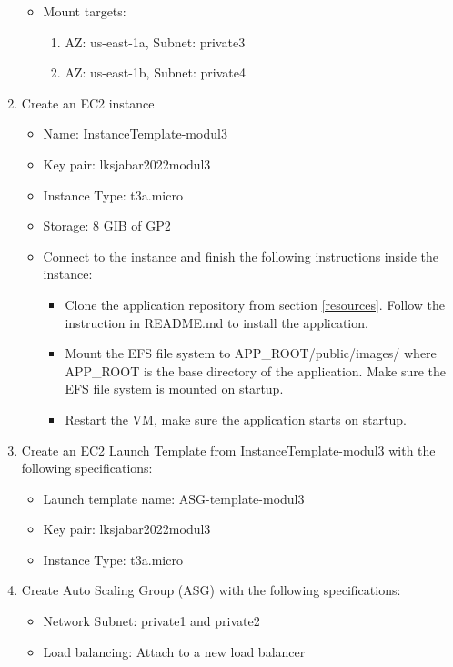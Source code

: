 \documentclass{article}
\begin{document}
\begin{enumerate}
\begin{itemize}
        \item Mount targets:
        \begin{enumerate}
            \item AZ: us-east-1a, Subnet: private3
            \item AZ: us-east-1b, Subnet: private4
        \end{enumerate}
    \end{itemize}
    \item Create an EC2 instance
    \begin{itemize}
        \item Name: InstanceTemplate-modul3
        \item Key pair: lksjabar2022modul3
        \item Instance Type: t3a.micro
        \item Storage: 8 GIB of GP2
        \item Connect to the instance and finish the following instructions inside the instance:
        \begin{itemize}
            \item Clone the application repository from section \ref{resources}. Follow the instruction in README.md to install the application.
            \item Mount the EFS file system to APP\_ROOT/public/images/ where APP\_ROOT is the base directory of the application. Make sure the EFS file system is mounted on startup.
            \item Restart the VM, make sure the application starts on startup.
        \end{itemize}
    \end{itemize}
    \item Create an EC2 Launch Template from InstanceTemplate-modul3 with the following specifications:
    \begin{itemize}
        \item Launch template name: ASG-template-modul3
        \item Key pair: lksjabar2022modul3
        \item Instance Type: t3a.micro
    \end{itemize}
    \item Create Auto Scaling Group (ASG) with the following specifications:
    \begin{itemize}
        \item Network Subnet: private1 and private2
        \item Load balancing: Attach to a new load balancer

\end{itemize}
\end{enumerate}
\end{document}

